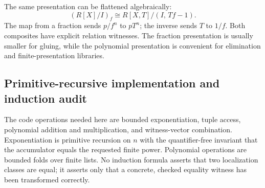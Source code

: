 The same presentation can be flattened algebraically:
\[
        (R[X]/I)_f \cong R[X,T]/(I,\,Tf-1).
\]
The map from a fraction sends $p/f^n$ to $pT^n$; the inverse sends $T$ to $1/f$.  Both composites have
explicit relation witnesses.  The fraction presentation is usually smaller for gluing, while the
polynomial presentation is convenient for elimination and finite-presentation libraries.

\subsection{Primitive-recursive implementation and induction audit}

The code operations needed here are bounded exponentiation, tuple access, polynomial addition and
multiplication, and witness-vector combination.  Exponentiation is primitive recursion on $n$ with
the quantifier-free invariant that the accumulator equals the requested finite power.  Polynomial
operations are bounded folds over finite lists.  No induction formula asserts that two localization
classes are equal; it asserts only that a concrete, checked equality witness has been transformed
correctly.
